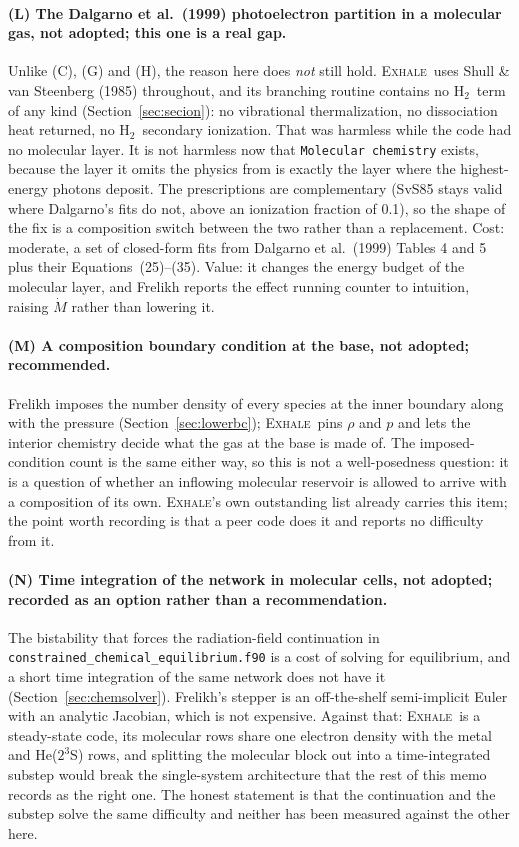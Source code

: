 \documentclass[english,a4paper]{my_memo}
\newcommand{\Mdot}{\dot{M}}
\newcommand{\EXHALE}{\textsc{Exhale}}
\newcommand{\Htwo}{\ensuremath{\mathrm{H}_2}}
\begin{document}
\paragraph{(L) The Dalgarno et al.\ (1999) photoelectron partition in a
molecular gas, not adopted; this one is a real gap.} Unlike (C), (G) and
(H), the reason here does \emph{not} still hold. \EXHALE\ uses Shull \& van
Steenberg (1985) throughout, and its branching routine contains no \Htwo\ term
of any kind (Section~\ref{sec:secion}): no vibrational thermalization, no
dissociation heat returned, no \Htwo\ secondary ionization. That was harmless
while the code had no molecular layer. It is not harmless now that
\texttt{Molecular chemistry} exists, because the layer it omits the physics
from is exactly the layer where the highest-energy photons deposit. The
prescriptions are complementary (SvS85 stays valid where Dalgarno's fits do
not, above an ionization fraction of 0.1), so the shape of the fix is a
composition switch between the two rather than a replacement. Cost: moderate,
a set of closed-form fits from Dalgarno et al.\ (1999) Tables 4 and 5 plus
their Equations~(25)--(35). Value: it changes the energy budget of the
molecular layer, and Frelikh reports the effect running counter to intuition,
raising $\Mdot$ rather than lowering it.

\paragraph{(M) A composition boundary condition at the base, not adopted;
recommended.} Frelikh imposes the number density of every species at the inner
boundary along with the pressure (Section~\ref{sec:lowerbc}); \EXHALE\ pins
$\rho$ and $p$ and lets the interior chemistry decide what the gas at the base
is made of. The imposed-condition count is the same either way, so this is not
a well-posedness question: it is a question of whether an inflowing
molecular reservoir is allowed to arrive with a composition of its own.
\EXHALE's own outstanding list already carries this item; the point worth
recording is that a peer code does it and reports no difficulty from it.

\paragraph{(N) Time integration of the network in molecular cells, not
adopted; recorded as an option rather than a recommendation.} The bistability
that forces the radiation-field continuation in
\texttt{constrained\_chemical\_\allowbreak equilibrium.f90} is a cost of
solving for
equilibrium, and a short time integration of the same network does not have
it (Section~\ref{sec:chemsolver}). Frelikh's stepper is an off-the-shelf
semi-implicit Euler with an analytic Jacobian, which is not expensive. Against
that: \EXHALE\ is a steady-state code, its molecular rows share one electron
density with the metal and He($2^3$S) rows, and splitting the molecular block
out into a time-integrated substep would break the single-system architecture
that the rest of this memo records as the right one. The honest statement is
that the continuation and the substep solve the same difficulty and neither
has been measured against the other here.
\end{document}
